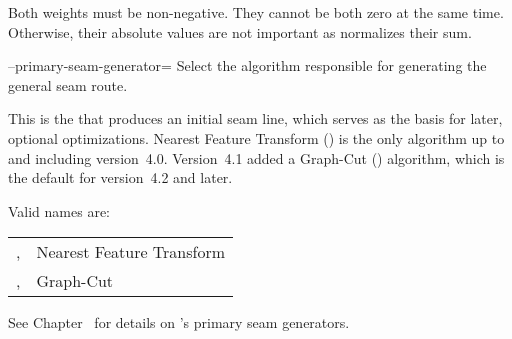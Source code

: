 \begin{codelist}
  Both weights must be non-negative.  They cannot be both zero at the
  same time.  Otherwise, their absolute values are not important as
  \App{} normalizes their sum.


  \label{opt:primary-seam-generator}%
\item[--primary-seam-generator=\metavar{ALGORITHM}]\itemend
  Select the algorithm responsible for
  generating the general seam route.

  This is the  that produces an initial seam line,
  which serves as the basis for later, optional optimizations.
  Nearest Feature Transform () is the only algorithm up
  to and including \App{} version~4.0.  Version~4.1 added a Graph-Cut
  () algorithm, which is the default for version~4.2 and
  later.

  Valid  names are:
  \begin{center}
    \begin{tabular}{p{.45\linewidth}l}
      \code{nearest-feature-transform}, \code{nft}\genidx{nearest
        feature transform (\acronym{NFT})} & Nearest Feature Transform \\
    \code{graph-cut}, \code{gc}\genidx{graph-cut (\acronym{GC})} &
    Graph-Cut
    \end{tabular}
  \end{center}

  See Chapter~ for details on \App's
  primary seam generators.
\end{codelist}

